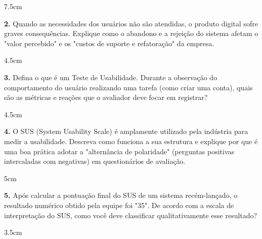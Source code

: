 \documentclass[12pt]{article}
\begin{document}
\begin{resposta}{7.5cm}
\end{resposta}


\textbf{2.} Quando as necessidades dos usuários não são atendidas, o produto digital sofre graves consequências. Explique como o abandono e a rejeição do sistema afetam o "valor percebido" e os "custos de suporte e refatoração" da empresa.
\begin{resposta}{4.5cm}
\end{resposta}

\vspace{0.5cm}

\textbf{3.} Defina o que é um Teste de Usabilidade. Durante a observação do comportamento do usuário realizando uma tarefa (como criar uma conta), quais são as métricas e reações que o avaliador deve focar em registrar?
\begin{resposta}{4.5cm}
\end{resposta}

\vspace{0.5cm}

\textbf{4.} O SUS (System Usability Scale) é amplamente utilizado pela indústria para medir a usabilidade. Descreva como funciona a sua estrutura e explique por que é uma boa prática adotar a "alternância de polaridade" (perguntas positivas intercaladas com negativas) em questionários de avaliação.
\begin{resposta}{5cm}
\end{resposta}

\vspace{0.5cm}

\textbf{5.} Após calcular a pontuação final do SUS de um sistema recém-lançado, o resultado numérico obtido pela equipe foi "35". De acordo com a escala de interpretação do SUS, como você deve classificar qualitativamente esse resultado?
\begin{resposta}{3.5cm}
\end{resposta}

\vspace{0.5cm}
\end{document}
